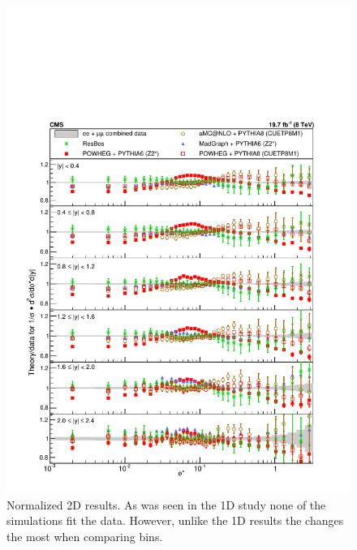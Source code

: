 \begin{figure}
    \centering
    \includegraphics[width=\linewidth]{figures/Results/Normalized2DRatio.pdf}
    \caption{Normalized 2D results. As was seen in the 1D study none of the simulations fit the data. However, unlike the 1D results the \MADGRAPH changes the most when comparing \rapidity bins.}
    \label{fig:Norm2Dratio}
\end{figure}
